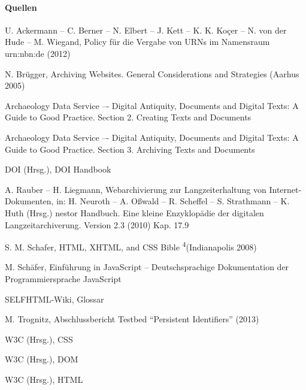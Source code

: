 \paragraph{Quellen}
\begin{flushleft}
U. Ackermann -- C. Berner -- N. Elbert -- J. Kett -- K. K. Koçer -- N. von der Hude -- M. Wiegand, Policy für die Vergabe von URNs im Namensraum urn:nbn:de (2012) 

N. Brügger, Archiving Websites. General Considerations and Strategies (Aarhus 2005) 

Archaeology Data Service –- Digital Antiquity, Documents and Digital Texts: A Guide to Good Practice. Section 2. Creating Texts and Documents 

Archaeology Data Service –- Digital Antiquity, Documents and Digital Texts: A Guide to Good Practice. Section 3. Archiving Texts and Documents 

DOI (Hrsg.), DOI Handbook 

A. Rauber -- H. Liegmann, Webarchivierung zur Langzeiterhaltung von Internet-Dokumenten, in: H. Neuroth -- A. Oßwald -- R. Scheffel -- S. Strathmann -- K. Huth (Hrsg.) nestor Handbuch. Eine kleine Enzyklopädie der digitalen Langzeitarchiverung. Version 2.3 (2010) Kap. 17.9 

S. M. Schafer, HTML, XHTML, and CSS Bible \textsuperscript{4}(Indianapolis 2008)\abstand

M. Schäfer, Einführung in JavaScript – Deutschsprachige Dokumentation der Programmiersprache JavaScript  

SELFHTML-Wiki, Glossar 

M. Trognitz, Abschlussbericht Testbed "`Persistent Identifiers"' (2013) 

W3C (Hrsg.), CSS 

W3C (Hrsg.), DOM 

W3C (Hrsg.), HTML 


\end{flushleft}
